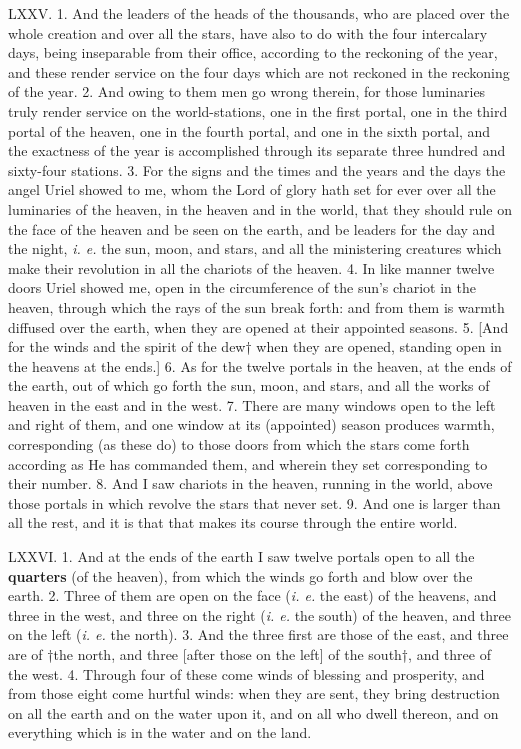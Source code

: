 LXXV. 1. And the leaders of the heads of the
thousands, who are placed over the whole creation
and over all the stars, have also to do with the four
intercalary days, being inseparable from their office,
according to the reckoning of the year, and these
render service on the four days which are not reckoned
in the reckoning of the year. 2. And owing to them
men go wrong therein, for those luminaries truly
render service on the world-stations, one in the first
portal, one in the third portal of the heaven, one in
the fourth portal, and one in the sixth portal, and
the exactness of the year is accomplished through
its separate three hundred and sixty-four stations.
3. For the signs and the times and the years and the
days the angel Uriel showed to me, whom the Lord
of glory hath set for ever over all the luminaries of the
heaven, in the heaven and in the world, that they
should rule on the face of the heaven and be seen on
the earth, and be leaders for the day and the night,
\emph{i. e.} the sun, moon, and stars, and all the ministering
creatures which make their revolution in all the
chariots of the heaven. 4. In like manner twelve
doors Uriel showed me, open in the circumference
of the sun’s chariot in the heaven, through which the
rays of the sun break forth: and from them is warmth
diffused over the earth, when they are opened at
their appointed seasons. 5. [And for the winds and
the spirit of the dew† when they are opened, standing
open in the heavens at the ends.] 6. As for the twelve
portals in the heaven, at the ends of the earth, out
of which go forth the sun, moon, and stars, and all
the works of heaven in the east and in the west.
7. There are many windows open to the left and right
of them, and one window at its (appointed) season
produces warmth, corresponding (as these do) to
those doors from which the stars come forth according
as He has commanded them, and wherein they
set corresponding to their number. 8. And I saw
chariots in the heaven, running in the world, above
those portals in which revolve the stars that never
set. 9. And one is larger than all the rest, and it is
that that makes its course through the entire world.


LXXVI. 1. And at the ends of the earth I saw
twelve portals open to all the \textbf{quarters} (of the heaven),
from which the winds go forth and blow over the
earth. 2. Three of them are open on the face (\emph{i. e.}
the east) of the heavens, and three in the west, and
three on the right (\emph{i. e.} the south) of the heaven, and
three on the left (\emph{i. e.} the north). 3. And the three
first are those of the east, and three are of †the
north, and three [after those on the left] of the
south†, and three of the west. 4. Through four of
these come winds of blessing and prosperity, and
from those eight come hurtful winds: when they are
sent, they bring destruction on all the earth and on
the water upon it, and on all who dwell thereon, and
on everything which is in the water and on the land.

